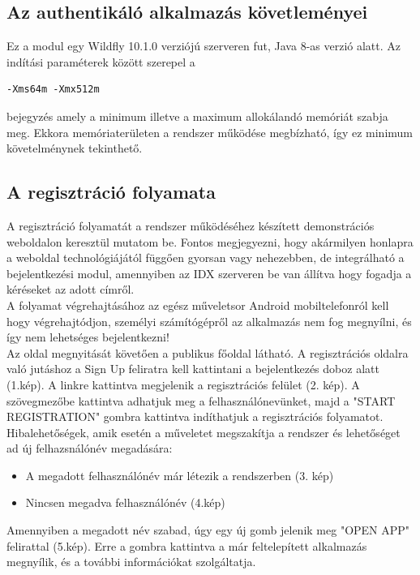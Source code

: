\subsection{Az authentikáló alkalmazás követleményei}

Ez a modul egy Wildfly 10.1.0 verziójú szerveren fut, Java 8-as verzió alatt. Az indítási paraméterek között szerepel a
\begin{verbatim}
-Xms64m -Xmx512m 
\end{verbatim}
bejegyzés amely a minimum illetve a maximum allokálandó memóriát szabja meg. Ekkora memóriaterületen a rendszer működése megbízható, így ez minimum követelménynek tekinthető.

\subsection{A regisztráció folyamata}
A regisztráció folyamatát a rendszer működéséhez készített demonstrációs weboldalon keresztül mutatom be. Fontos megjegyezni, hogy akármilyen honlapra a weboldal technológiájától függően gyorsan vagy nehezebben, de integrálható a bejelentkezési modul, amennyiben az IDX szerveren be van állítva hogy fogadja a kéréseket az adott címről.
\\A folyamat végrehajtásához az egész műveletsor Android mobiltelefonról kell hogy végrehajtódjon, személyi számítógépről az alkalmazás nem fog megnyílni, és így nem lehetséges bejelentkezni!
\\Az oldal megnyitását követően a publikus főoldal látható. A regisztrációs oldalra való jutáshoz a Sign Up feliratra kell kattintani a bejelentkezés doboz alatt (1.kép). A linkre kattintva megjelenik a regisztrációs felület (2. kép). A szövegmezőbe kattintva adhatjuk meg a felhasználónevünket, majd a "START REGISTRATION" gombra kattintva indíthatjuk a regisztrációs folyamatot. Hibalehetőségek, amik esetén a műveletet megszakítja a rendszer és lehetőséget ad új felhazsnálónév megadására:
\begin{itemize}
\item A megadott felhasználónév már létezik a rendszerben (3. kép)
\item Nincsen megadva felhasználónév (4.kép)
\end{itemize}

Amennyiben a megadott név szabad, úgy egy új gomb jelenik meg "OPEN APP" felirattal (5.kép). 
Erre a gombra kattintva a már feltelepített alkalmazás megnyílik, és a további információkat szolgáltatja.

\newpage